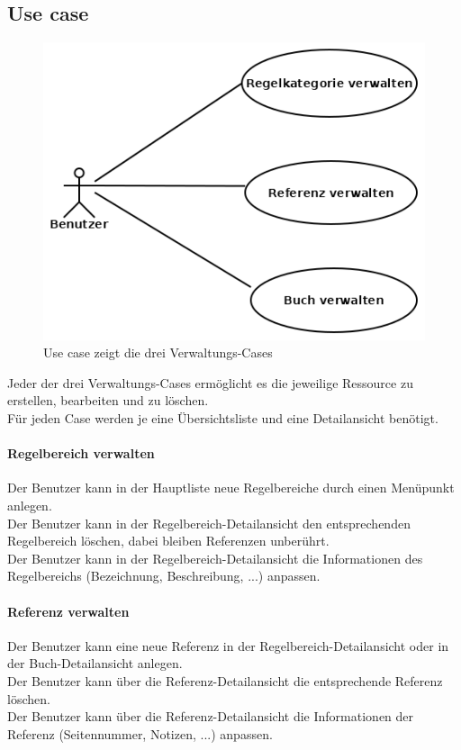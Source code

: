 \subsection{Use case}
\begin{figure}
\includegraphics[width=\textwidth]{usecase.png}
\caption{Use case zeigt die drei Verwaltungs-Cases}
\end{figure}
Jeder der drei Verwaltungs-Cases ermöglicht es die jeweilige Ressource zu erstellen, bearbeiten und zu löschen.\\
Für jeden Case werden je eine Übersichtsliste und eine Detailansicht benötigt.\\
\paragraph{Regelbereich verwalten}
Der Benutzer kann in der Hauptliste neue Regelbereiche durch einen Menüpunkt anlegen.\\
Der Benutzer kann in der Regelbereich-Detailansicht den entsprechenden Regelbereich löschen, dabei bleiben Referenzen unberührt.\\
Der Benutzer kann in der Regelbereich-Detailansicht die Informationen des Regelbereichs (Bezeichnung, Beschreibung, ...) anpassen.
\paragraph{Referenz verwalten}
Der Benutzer kann eine neue Referenz in der Regelbereich-Detailansicht oder in der Buch-Detailansicht anlegen.\\
Der Benutzer kann über die Referenz-Detailansicht die entsprechende Referenz löschen.\\
Der Benutzer kann über die Referenz-Detailansicht die Informationen der Referenz (Seitennummer, Notizen, ...) anpassen.
